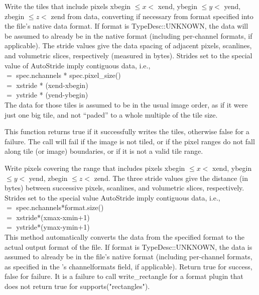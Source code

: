 Write the tiles that include pixels {\kw xbegin} $\le x <$ {\kw xend},
{\kw ybegin} $\le y <$ {\kw yend}, {\kw zbegin} $\le z <$ {\kw zend}
from {\kw data},
converting if necessary from {\kw format} specified into the file's
native data format.
If {\cf format} is {\cf TypeDesc::UNKNOWN}, the data will be assumed
to already be in the native format (including per-channel formats, if applicable).
The stride values
give the data spacing of adjacent pixels, scanlines, and volumetric
slices, respectively (measured in bytes).  Strides set to the special
value of {\kw AutoStride} imply contiguous data, i.e., \\
 $=$ {\kw spec.nchannels * spec.pixel_size()} \\
 $=$ {\kw xstride * (xend-xbegin)} \\
 $=$ {\kw ystride * (yend-ybegin)} \\
The data for those tiles is assumed to be in the usual image order, as if
it were just one big tile, and not ``paded'' to a whole multiple of the tile size.

This function returns {\cf true} if it successfully writes the tiles,
otherwise {\cf false} for a failure.
The call will fail if the image is not tiled, or if the pixel ranges
do not fall along tile (or image) boundaries, or if it is not a valid
tile range.
\apiend


Write pixels covering the range that includes pixels {\kw xbegin} $\le x <$ {\kw xend},
{\kw ybegin} $\le y <$ {\kw yend}, {\kw zbegin} $\le z <$ {\kw zend}.
The three stride values give the distance
(in bytes) between successive pixels, scanlines, and volumetric slices,
respectively.  Strides set to the special value {\kw AutoStride} imply
contiguous data, i.e.,\\
 $=$ {\kw spec.nchannels*format.size()} \\
 $=$ {\kw xstride*(xmax-xmin+1)} \\
 $=$ {\kw ystride*(ymax-ymin+1)}\\
This method automatically converts the data from the specified 
{\kw format} to the actual output format of the file.  
If {\cf format} is {\cf TypeDesc::UNKNOWN}, the data is assumed to
already be in the file's native format (including per-channel formats, 
as specified in the \ImageSpec's {\cf channelformats} field, if applicable).
Return {\kw true}
for success, {\kw false} for failure.  It is a failure to call 
{\kw write_rectangle} for a format plugin that does not return true for
{\kw supports("rectangles")}.


